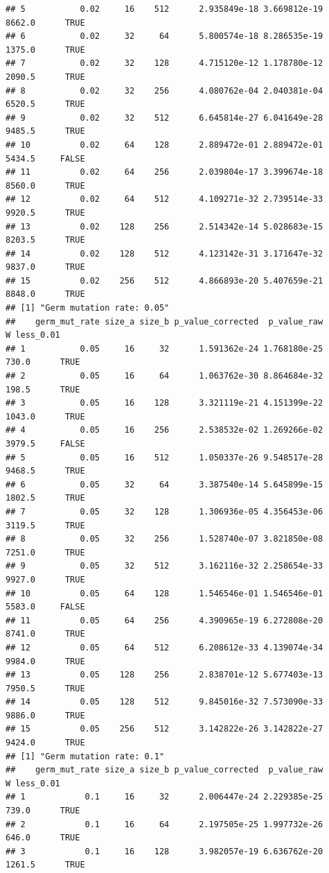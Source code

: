 \documentclass[]{book}
\begin{document}
\begin{verbatim}
## 5           0.02     16    512      2.935849e-18 3.669812e-19 8662.0      TRUE
## 6           0.02     32     64      5.800574e-18 8.286535e-19 1375.0      TRUE
## 7           0.02     32    128      4.715120e-12 1.178780e-12 2090.5      TRUE
## 8           0.02     32    256      4.080762e-04 2.040381e-04 6520.5      TRUE
## 9           0.02     32    512      6.645814e-27 6.041649e-28 9485.5      TRUE
## 10          0.02     64    128      2.889472e-01 2.889472e-01 5434.5     FALSE
## 11          0.02     64    256      2.039804e-17 3.399674e-18 8560.0      TRUE
## 12          0.02     64    512      4.109271e-32 2.739514e-33 9920.5      TRUE
## 13          0.02    128    256      2.514342e-14 5.028683e-15 8203.5      TRUE
## 14          0.02    128    512      4.123142e-31 3.171647e-32 9837.0      TRUE
## 15          0.02    256    512      4.866893e-20 5.407659e-21 8848.0      TRUE
## [1] "Germ mutation rate: 0.05"
##    germ_mut_rate size_a size_b p_value_corrected  p_value_raw      W less_0.01
## 1           0.05     16     32      1.591362e-24 1.768180e-25  730.0      TRUE
## 2           0.05     16     64      1.063762e-30 8.864684e-32  198.5      TRUE
## 3           0.05     16    128      3.321119e-21 4.151399e-22 1043.0      TRUE
## 4           0.05     16    256      2.538532e-02 1.269266e-02 3979.5     FALSE
## 5           0.05     16    512      1.050337e-26 9.548517e-28 9468.5      TRUE
## 6           0.05     32     64      3.387540e-14 5.645899e-15 1802.5      TRUE
## 7           0.05     32    128      1.306936e-05 4.356453e-06 3119.5      TRUE
## 8           0.05     32    256      1.528740e-07 3.821850e-08 7251.0      TRUE
## 9           0.05     32    512      3.162116e-32 2.258654e-33 9927.0      TRUE
## 10          0.05     64    128      1.546546e-01 1.546546e-01 5583.0     FALSE
## 11          0.05     64    256      4.390965e-19 6.272808e-20 8741.0      TRUE
## 12          0.05     64    512      6.208612e-33 4.139074e-34 9984.0      TRUE
## 13          0.05    128    256      2.838701e-12 5.677403e-13 7950.5      TRUE
## 14          0.05    128    512      9.845016e-32 7.573090e-33 9886.0      TRUE
## 15          0.05    256    512      3.142822e-26 3.142822e-27 9424.0      TRUE
## [1] "Germ mutation rate: 0.1"
##    germ_mut_rate size_a size_b p_value_corrected  p_value_raw      W less_0.01
## 1            0.1     16     32      2.006447e-24 2.229385e-25  739.0      TRUE
## 2            0.1     16     64      2.197505e-25 1.997732e-26  646.0      TRUE
## 3            0.1     16    128      3.982057e-19 6.636762e-20 1261.5      TRUE

\end{verbatim}
\end{document}
